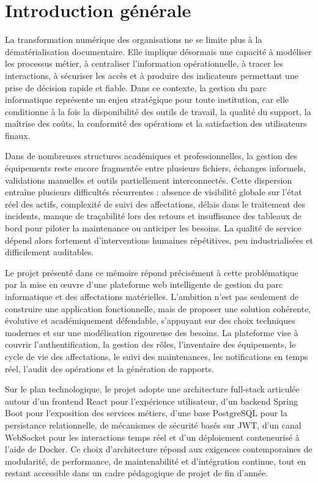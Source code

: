 ﻿\documentclass[12pt,a4paper,oneside]{report}
\begin{document}
\clearpage
{}


\chapter*{Introduction générale}

La transformation numérique des organisations ne se limite plus à la dématérialisation documentaire. Elle implique désormais une capacité à modéliser les processus métier, à centraliser l'information opérationnelle, à tracer les interactions, à sécuriser les accès et à produire des indicateurs permettant une prise de décision rapide et fiable. Dans ce contexte, la gestion du parc informatique représente un enjeu stratégique pour toute institution, car elle conditionne à la fois la disponibilité des outils de travail, la qualité du support, la maîtrise des coûts, la conformité des opérations et la satisfaction des utilisateurs finaux.

Dans de nombreuses structures académiques et professionnelles, la gestion des équipements reste encore fragmentée entre plusieurs fichiers, échanges informels, validations manuelles et outils partiellement interconnectés. Cette dispersion entraîne plusieurs difficultés récurrentes : absence de visibilité globale sur l'état réel des actifs, complexité de suivi des affectations, délais dans le traitement des incidents, manque de traçabilité lors des retours et insuffisance des tableaux de bord pour piloter la maintenance ou anticiper les besoins. La qualité de service dépend alors fortement d'interventions humaines répétitives, peu industrialisées et difficilement auditables.

Le projet présenté dans ce mémoire répond précisément à cette problématique par la mise en œuvre d'une plateforme web intelligente de gestion du parc informatique et des affectations matérielles. L'ambition n'est pas seulement de construire une application fonctionnelle, mais de proposer une solution cohérente, évolutive et académiquement défendable, s'appuyant sur des choix techniques modernes et sur une modélisation rigoureuse des besoins. La plateforme vise à couvrir l'authentification, la gestion des rôles, l'inventaire des équipements, le cycle de vie des affectations, le suivi des maintenances, les notifications en temps réel, l'audit des opérations et la génération de rapports.

Sur le plan technologique, le projet adopte une architecture full-stack articulée autour d'un frontend React pour l'expérience utilisateur, d'un backend Spring Boot pour l'exposition des services métiers, d'une base PostgreSQL pour la persistance relationnelle, de mécanismes de sécurité basés sur JWT, d'un canal WebSocket pour les interactions temps réel et d'un déploiement conteneurisé à l'aide de Docker. Ce choix d'architecture répond aux exigences contemporaines de modularité, de performance, de maintenabilité et d'intégration continue, tout en restant accessible dans un cadre pédagogique de projet de fin d'année.
\end{document}
